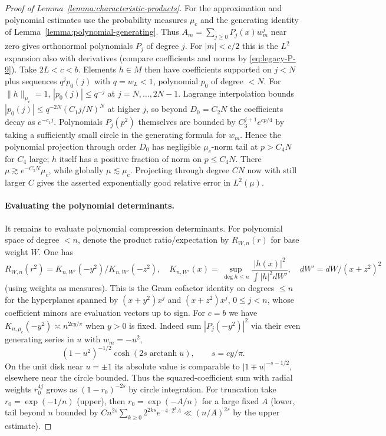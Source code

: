 \begin{proof}[Proof of Lemma~\ref{lemma:characteristic-products}]
For the approximation and polynomial estimates use the probability measures $\mu_c$ and the generating identity of Lemma~\ref{lemma:polynomial-generating}. Thus $A_m=\sum_{j\ge0} P_j(x)w_m^j$ near zero gives orthonormal polynomials $P_j$ of degree $j$. For $|m|<c/2$ this is the $L^2$ expansion also with derivatives (compare coefficients and norms by \eqref{eq:legacy-P-9}). Take $2L<c<b$. Elements $h\in M$ then have coefficients supported on $j<N$ plus sequences $q^j p_0(j)$ with $q=w_L<1$, polynomial $p_0$ of degree $<N$. For $\|h\|_{\mu_c}=1$, $|p_0(j)|\le q^{-j}$ at $j=N,\ldots,2N-1$. Lagrange interpolation bounds $|p_0(j)|\le q^{-2N}(C_1 j/N)^N$ at higher $j$, so beyond $D_0=C_2N$ the coefficients decay as $e^{-c_1 j}$. Polynomials $P_j(p^2)$ themselves are bounded by $C_3^{j+1} e^{cp/4}$ by taking a sufficiently small circle in the generating formula for $w_m$. Hence the polynomial projection through order $D_0$ has negligible $\mu_c$-norm tail at $p>C_4N$ for $C_4$ large; $h$ itself has a positive fraction of norm on $p\le C_4N$. There $\mu\gtrsim e^{-C_5 N}\mu_c$, while globally $\mu\lesssim\mu_c$. Projecting through degree $CN$ now with still larger $C$ gives the asserted exponentially good relative error in $L^2(\mu)$.

\paragraph{Evaluating the polynomial determinants.}
It remains to evaluate polynomial compression determinants. For polynomial space of degree $<n$, denote the product ratio/expectation by $R_{W,n}(r)$ for base weight $W$. One has
\[
 R_{W,n}(r^2)=K_{n,W'}(-y^2)/K_{n,W'}(-z^2),\quad
 K_{n,W'}(x)=\sup_{\deg h\le n}\frac{|h(x)|^2}{\int |h|^2dW'},\quad dW'=dW/(x+z^2)^2
\]
(using weights as measures). This is the Gram cofactor identity on degrees $\le n$ for the hyperplanes spanned by $(x+y^2)x^j$ and $(x+z^2)x^j$, $0\le j<n$, whose coefficient minors are evaluation vectors up to sign. For $c=b$ we have $K_{n,\mu_c}(-y^2)\asymp n^{2c y/\pi}$ when $y>0$ is fixed. Indeed sum $|P_j(-y^2)|^2$ via their even generating series in $u$ with $w_m=-u^2$,
\[
 (1-u^2)^{-1/2}\cosh(2s\operatorname{arctanh}u),\qquad s=cy/\pi.
\]
On the unit disk near $u=\pm1$ its absolute value is comparable to $|1\mp u|^{-s-1/2}$, elsewhere near the circle bounded. Thus the squared-coefficient sum with radial weights $r_0^{4j}$ grows as $(1-r_0)^{-2s}$ by circle integration. For truncation take $r_0=\exp(-1/n)$ (upper), then $r_0=\exp(-A/n)$ for a large fixed $A$ (lower, tail beyond $n$ bounded by $C n^{2s}\sum_{k\ge0}2^{2ks} e^{-4\cdot2^k A}\ll (n/A)^{2s}$ by the upper estimate).


\end{proof}
